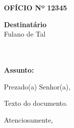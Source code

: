 \documentclass[a4paper,12pt]{article}
\begin{document}
\begin{center}
    \textbf{OFÍCIO Nº 12345}
\end{center}

\vspace{1cm}

\begin{flushright}
    \textbf{Destinatário} \\
    Fulano de Tal \\
     \\
     \\
    
\end{flushright}

\vspace{1cm}

\textbf{Assunto:} 

\vspace{1cm}

Prezado(a) Senhor(a),

\bigskip

Texto do documento.

\bigskip

Atenciosamente,

\vspace{1cm}

\hrulefill \\
 \\
 \\
 \\
\end{document}
